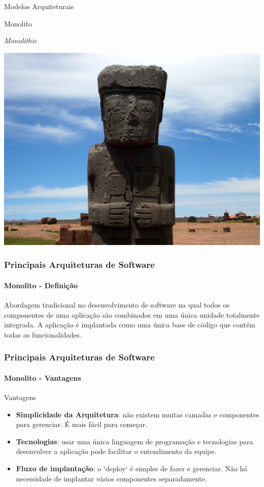 \documentclass[
	10pt, %
	t, %
]{beamer}
\begin{document}
\begin{frame}
	\begin{center}
		
		\bigskip\bigskip %
		{\Large Modelos Arquiteturais}
		
		\bigskip\bigskip %
		{\Huge Monolito}
		
		\smallskip
		{\small \textit{Monolithic}}
		\smallskip

		\includegraphics[width=0.5\linewidth]{Images/monolito_estrutura.jpg}
	\end{center}

\end{frame}

\begin{frame}
	\frametitle{Principais Arquiteturas de Software}
	\framesubtitle{Monolito - Definição}
	
	Abordagem tradicional no desenvolvimento de software na qual todos os componentes de uma aplicação são combinados em uma única unidade totalmente integrada. A aplicação é implantada como uma \alert{única base de código} que contém todas as funcionalidades.

\end{frame}

\begin{frame}
	\frametitle{Principais Arquiteturas de Software}
	\framesubtitle{Monolito - Vantagens}

	\begin{exampleblock}{Vantagens}
		\begin{itemize}
			\item \textbf{Simplicidade da Arquitetura}: não existem muitas camadas e componentes para gerenciar. É mais fácil para começar.
			\item \textbf{Tecnologias}: usar uma única linguagem de programação e tecnologias para desenvolver a aplicação pode facilitar o entendimento da equipe.
			\item \textbf{Fluxo de implantação}: o `deploy` é simples de fazer e gerenciar. Não há necessidade de implantar vários componentes separadamente.
		\end{itemize}
	\end{exampleblock}

\end{frame}
\end{document}
